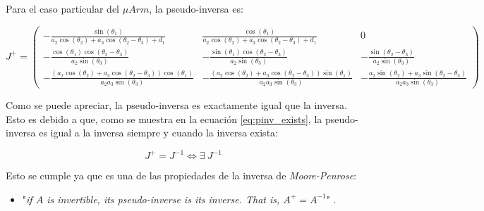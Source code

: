 \documentclass[a4paper,12pt]{article}
\begin{document}
Para el caso particular del $\mu Arm$, la pseudo-inversa es:

\begin{equation}
    J^+ =
    \begin{pmatrix}
        - \frac{\sin{\left(\theta_{1} \right)}}{a_{2} \cos{\left(\theta_{2} \right)} + a_{3} \cos{\left(\theta_{2} - \theta_{3} \right)} + d_{1}}                                                & \frac{\cos{\left(\theta_{1} \right)}}{a_{2}
        \cos{\left(\theta_{2} \right)} + a_{3} \cos{\left(\theta_{2} - \theta_{3} \right)} + d_{1}}                                                                                              & 0                                                                                                                                                                                                                                                                                                                                         \\
        - \frac{\cos{\left(\theta_{1} \right)} \cos{\left(\theta_{2} - \theta_{3} \right)}}{a_{2} \sin{\left(\theta_{3} \right)}}                                                                & - \frac{\sin{\left(\theta_{1} \right)} \cos{\left(\theta_{2} - \theta_{3} \right)}}{a_{2} \sin{\left(\theta_{3} \right)}}                                                                 & - \frac{\sin{\left(\theta_{2} - \theta_{3} \right)}}{a_{2} \sin{\left(\theta_{3} \right)}}                                                    \\
        - \frac{\left(a_{2} \cos{\left(\theta_{2} \right)} + a_{3} \cos{\left(\theta_{2} - \theta_{3} \right)}\right) \cos{\left(\theta_{1} \right)}}{a_{2} a_{3} \sin{\left(\theta_{3}\right)}} & - \frac{\left(a_{2} \cos{\left(\theta_{2} \right)} + a_{3} \cos{\left(\theta_{2} - \theta_{3} \right)}\right) \sin{\left(\theta_{1} \right)}}{a_{2} a_{3} \sin{\left(\theta_{3} \right)}} & - \frac{a_{2} \sin{\left(\theta_{2} \right)} + a_{3} \sin{\left(\theta_{2} - \theta_{3} \right)}}{a_{2} a_{3} \sin{\left(\theta_{3} \right)}}
    \end{pmatrix}
\end{equation}

Como se puede apreciar, la pseudo-inversa es exactamente igual que la inversa. Esto
es debido a que, como se muestra en la ecuación \ref{eq:pinv_exists}, la pseudo-inversa
es igual a la inversa siempre y cuando la inversa exista:

\begin{equation*}
    J^+ = J^{-1} \Leftrightarrow \exists ~ J^{-1}
\end{equation*}

Esto se cumple ya que es una de las propiedades de la inversa de \textit{Moore-Penrose}:

\begin{itemize}
    \item "\textit{if $A$ is invertible, its pseudo-inverse is its inverse. That is,
              $A^+ = A^{-1}$}" \cite{noauthor_moorepenrose_2019}.
\end{itemize}

\newpage
\printbibliography
\end{document}
